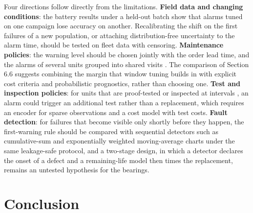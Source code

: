 \documentclass[a4paper,fleqn,doubleblind]{cas-dc}
\begin{document}
Four directions follow directly from the limitations. \textbf{Field data and changing conditions}: the battery results under a held-out batch show that alarms tuned on one campaign lose accuracy on another. Recalibrating the shift on the first failures of a new population, or attaching distribution-free uncertainty to the alarm time, should be tested on fleet data with censoring. \textbf{Maintenance policies}: the warning level should be chosen jointly with the order lead time, and the alarms of several units grouped into shared visits \cite{depater2022,mitici2023}. The comparison of Section 6.6 suggests combining the margin that window tuning builds in with explicit cost criteria and probabilistic prognostics, rather than choosing one. \textbf{Test and inspection policies}: for units that are proof-tested or inspected at intervals \cite{dejonge2020}, an alarm could trigger an additional test rather than a replacement, which requires an encoder for sparse observations and a cost model with test costs. \textbf{Fault detection}: for failures that become visible only shortly before they happen, the first-warning rule should be compared with sequential detectors such as cumulative-sum and exponentially weighted moving-average charts \cite{page1954,roberts1959} under the same leakage-safe protocol, and a two-stage design, in which a detector declares the onset of a defect and a remaining-life model then times the replacement, remains an untested hypothesis for the bearings.

\section{Conclusion}\label{sec:9}
\end{document}

